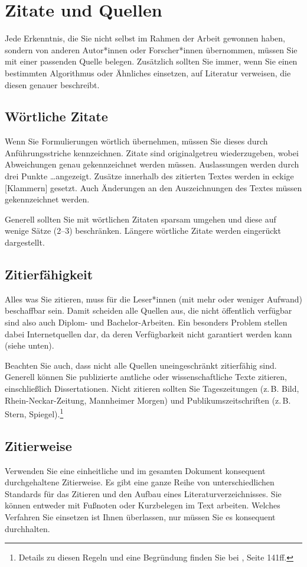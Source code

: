 \documentclass[a4paper,11pt,headings=normal]{scrartcl}
\begin{document}
\section{Zitate und Quellen}
Jede Erkenntnis, die Sie nicht selbst im Rahmen der Arbeit gewonnen haben, sondern von anderen Autor*innen oder Forscher*innen übernommen, müssen Sie mit einer passenden Quelle belegen. Zusätzlich sollten Sie immer, wenn Sie einen bestimmten Algorithmus oder Ähnliches einsetzen, auf Literatur verweisen, die diesen genauer beschreibt.

\subsection{Wörtliche Zitate}
Wenn Sie Formulierungen wörtlich übernehmen, müssen Sie dieses durch Anführungsstriche kennzeichnen. Zitate sind originalgetreu wiederzugeben, wobei Abweichungen genau gekennzeichnet werden müssen. Auslassungen werden durch drei Punkte \dots angezeigt. Zusätze innerhalb des zitierten Textes werden in eckige [Klammern] gesetzt. Auch Änderungen an den Auszeichnungen des Textes müssen gekennzeichnet werden.

Generell sollten Sie mit wörtlichen Zitaten sparsam umgehen und diese auf wenige Sätze (2--3) beschränken. Längere wörtliche Zitate werden eingerückt dargestellt.

\subsection{Zitierfähigkeit}
Alles was Sie zitieren, muss für die Leser*innen (mit mehr oder weniger Aufwand) beschaffbar sein. Damit scheiden alle Quellen aus, die nicht öffentlich verfügbar sind also auch Diplom- und Bachelor-Arbeiten. Ein besonders Problem stellen dabei Internetquellen dar, da deren Verfügbarkeit nicht garantiert werden kann (siehe unten).

Beachten Sie auch, dass nicht alle Quellen uneingeschränkt zitierfähig sind. Generell können Sie publizierte amtliche oder wissenschaftliche Texte zitieren, einschließlich Dissertationen. Nicht zitieren sollten Sie Tageszeitungen (z.\,B. Bild, Rhein-Neckar-Zeitung, Mannheimer Morgen) und Publikumszeitschriften (z.\,B. Stern, Spiegel).\footnote{Details zu diesen Regeln und eine Begründung finden Sie bei \autocite{Kramer2009}, Seite 141ff.}

\subsection{Zitierweise}
Verwenden Sie eine einheitliche und im gesamten Dokument konsequent durchgehaltene Zitierweise. Es gibt eine ganze Reihe von unterschiedlichen Standards für das Zitieren und den Aufbau eines Literaturverzeichnisses. Sie können entweder mit Fußnoten oder Kurzbelegen im Text arbeiten. Welches Verfahren Sie einsetzen ist Ihnen überlassen, nur müssen Sie es konsequent durchhalten.
\end{document}
